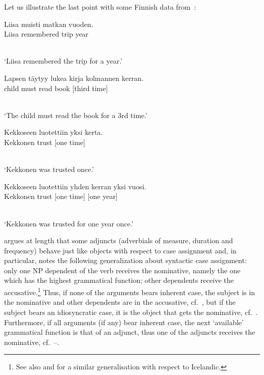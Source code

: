 \documentclass[output=paper]{langsci/langscibook}
\begin{document}
Let us illustrate the last point with some Finnish data from~\citealt{mali:93}:
\begin{examples}
\item \label{subj}
  \begin{gloss}
    Liisa muisti matkan vuoden. \\
    Liisa\Nom{} remembered trip\Acc{} year\Acc{}
  \end{gloss}\\[\glosslen]
  `Liisa remembered the trip for a year.'
\item \label{adv1bis} \label{obj}
  \begin{gloss}
    Lapsen t\"aytyy lukea kirja \phtm{[}kolmannen kerran. \\
    child\Gen{} must read book\Nom{} [third time]\Acc{}
  \end{gloss}\\[\glosslen]
  `The child must read the book for a 3rd time.'
\item \label{adv1}
  \begin{gloss}
    Kekkoseen luotettiin \phtm{[}yksi kerta. \\
    Kekkonen\Ill{} trust\PassP{} [one time]\Nom{}
  \end{gloss}\\[\glosslen]
  `Kekkonen was trusted once.'
\item \label{adv2}
  \begin{gloss}
    Kekkoseen luotettiin \phtm{[}yhden kerran \phtm{[}yksi vuosi. \\
    Kekkonen\Ill{} trust\PassP{} [one time]\Acc{} [one year]\Nom{}
  \end{gloss}\\[\glosslen]
  `Kekkonen was trusted for one year once.'
\end{examples}
\citet{mali:93} argues at length that some adjuncts (adverbials of measure,
duration and frequency) behave just like objects with respect to case
assignment and, in particular, notes the following generalization about
syntactic case assignment: only one NP dependent of the verb receives the
nominative, namely the one which has the highest grammatical function;
other dependents receive the accusative.\footnote{See also
  \citealt{zae:mal:83} and \citealt{ZMT85a} for a similar generalisation with respect to
  Icelandic.}  Thus, if none of the arguments bears inherent case, the
subject is in the nominative and other dependents are in the accusative, cf.~, but if the subject bears an idiosyncratic case, it is the
object that gets the nominative, cf.~.  Furthermore, if all arguments
(if any) bear inherent case, the next ‘available’ grammatical function is
that of an adjunct, thus one of the adjuncts receives the nominative, 
cf.~–.
\end{document}
